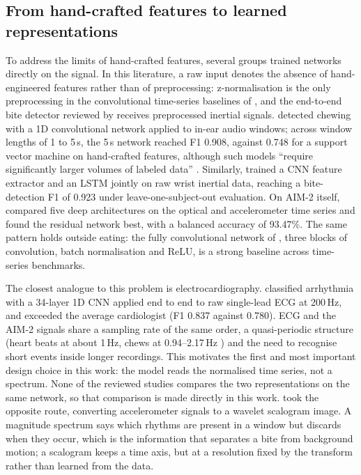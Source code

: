 \subsection{From hand-crafted features to learned representations}

To address the limits of hand-crafted features, several groups trained
networks directly on the signal. In this literature, a raw input denotes the
absence of hand-engineered features rather than of preprocessing:
z-normalisation is the only preprocessing in the convolutional time-series
baselines of \citet{wang2017strong}, and the end-to-end bite detector reviewed
by \citet{diou2022intake} receives preprocessed inertial signals.
\citet{papapanagiotou2017chewing} detected chewing with a 1D convolutional
network applied to in-ear audio windows; across window lengths of 1 to 5\,s,
the 5\,s network reached F1 0.908, against 0.748 for a support vector machine
on hand-crafted features, although such models ``require significantly
larger volumes of labeled data'' \citep{diou2022intake}. Similarly, \citet{kyritsis2021endtoend} trained a CNN feature extractor and
an LSTM jointly on raw wrist inertial data, reaching a bite-detection F1 of
0.923 under leave-one-subject-out evaluation. On AIM-2 itself,
\citet{ghosh2022comparative} compared five deep architectures on the optical
and accelerometer time series and found the residual network best, with a
balanced accuracy of 93.47\%. The same pattern holds outside eating: the
fully convolutional network of \citet{wang2017strong}, three blocks of
convolution, batch normalisation and ReLU, is a strong baseline across
time-series benchmarks.

The closest analogue to this problem is electrocardiography.
\citet{hannun2019cardiologist} classified arrhythmia with a 34-layer 1D CNN
applied end to end to raw single-lead ECG at 200\,Hz, and exceeded the
average cardiologist (F1 0.837 against 0.780). ECG and the AIM-2 signals
share a sampling rate of the same order, a quasi-periodic structure (heart
beats at about 1\,Hz, chews at 0.94--2.17\,Hz \citep{po2011chewing}) and the
need to recognise short events inside longer recordings. This motivates the
first and most important design choice in this work: the model reads the
normalised time series, not a spectrum. None of the reviewed studies
compares the two representations on the same network, so that comparison is
made directly in this work. \citet{ghosh2024integrated} took the opposite
route, converting accelerometer signals to a wavelet scalogram image. A
magnitude spectrum says which rhythms are present in a window but discards
when they occur, which is the information that separates a bite from
background motion; a scalogram keeps a time axis, but at a resolution fixed
by the transform rather than learned from the data.


